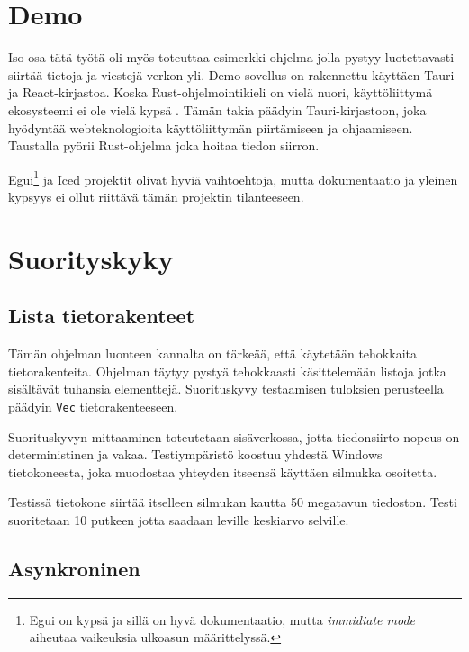 \documentclass[a4paper,12pt]{article}
\begin{document}
    \section{Demo}\label{sec:demo}
    Iso osa tätä työtä oli myös toteuttaa esimerkki ohjelma jolla pystyy luotettavasti siirtää tietoja ja viestejä verkon yli. Demo-sovellus on rakennettu käyttäen Tauri- ja React-kirjastoa. Koska Rust-ohjelmointikieli on vielä nuori, käyttöliittymä ekosysteemi ei ole vielä kypsä \cite{AreYet}. Tämän takia päädyin Tauri-kirjastoon, joka hyödyntää webteknologioita käyttöliittymän piirtämiseen ja ohjaamiseen. Taustalla pyörii Rust-ohjelma joka hoitaa tiedon siirron. \par
    Egui\footnote{Egui on kypsä ja sillä on hyvä dokumentaatio, mutta \textit{immidiate mode} aiheutaa vaikeuksia ulkoasun määrittelyssä. } ja Iced projektit olivat hyviä vaihtoehtoja, mutta dokumentaatio ja yleinen kypsyys ei ollut riittävä tämän projektin tilanteeseen.

    \section{Suorityskyky}\label{sec:suorityskyky}

    \subsection{Lista tietorakenteet}
    Tämän ohjelman luonteen kannalta on tärkeää, että käytetään tehokkaita tietorakenteita. Ohjelman täytyy pystyä tehokkaasti käsittelemään listoja jotka sisältävät tuhansia elementtejä. Suorituskyvy testaamisen tuloksien perusteella päädyin \lstinline{Vec} tietorakenteeseen.

    
    Suorituskyvyn mittaaminen toteutetaan sisäverkossa, jotta tiedonsiirto nopeus on deterministinen ja vakaa.
    Testiympäristö koostuu yhdestä Windows tietokoneesta, joka muodostaa yhteyden itseensä käyttäen silmukka osoitetta.\par
    Testissä tietokone siirtää itselleen silmukan kautta 50 megatavun tiedoston. Testi suoritetaan 10 putkeen jotta saadaan leville keskiarvo selville.

    \subsection{Asynkroninen}
    \printbibliography
\end{document}
